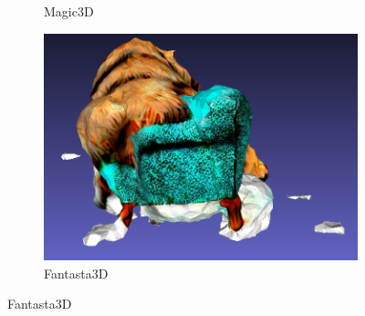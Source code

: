 \begin{figure}[ht]
\begin{subfigure}[b]{0.3\textwidth}
        \caption{Magic3D}
        \vspace{0.1cm}
    \end{subfigure}
    \begin{subfigure}[b]{0.34\textwidth}
        \centering
        \includegraphics[width=\textwidth]{figures/subjective/fantasia_dog_back_result.png}
        \caption{Fantasta3D}
        \vspace{0.1cm}
    \end{subfigure}


\end{figure}
